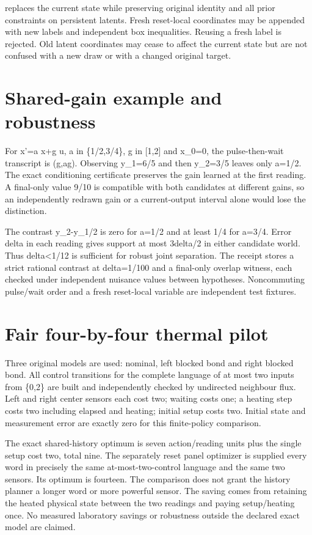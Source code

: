 \documentclass[
  11pt,
  a4paper,
]{report}
\let\singularitytexttt\texttt
\renewcommand{\texttt}[1]{\singularitytexttt{\seqsplit{#1}}}
\begin{document}
\texttt{affine\_reset} replaces the current state while preserving
original identity and all prior constraints on persistent latents. Fresh
reset-local coordinates may be appended with new labels and independent
box inequalities. Reusing a fresh label is rejected. Old latent
coordinates may cease to affect the current state but are not confused
with a new draw or with a changed original target.

\hypertarget{shared-gain-example-and-robustness}{%
\section{Shared-gain example and
robustness}\label{shared-gain-example-and-robustness}}

For x'=a x+g u, a in \{1/2,3/4\}, g in {[}1,2{]} and x\_0=0, the
pulse-then-wait transcript is (g,ag). Observing y\_1=6/5 and then
y\_2=3/5 leaves only a=1/2. The exact conditioning certificate preserves
the gain learned at the first reading. A final-only value 9/10 is
compatible with both candidates at different gains, so an independently
redrawn gain or a current-output interval alone would lose the
distinction.

The contrast y\_2-y\_1/2 is zero for a=1/2 and at least 1/4 for a=3/4.
Error delta in each reading gives support at most 3delta/2 in either
candidate world. Thus delta\textless1/12 is sufficient for robust joint
separation. The receipt stores a strict rational contrast at delta=1/100
and a final-only overlap witness, each checked under independent
nuisance values between hypotheses. Noncommuting pulse/wait order and a
fresh reset-local variable are independent test fixtures.

\hypertarget{fair-four-by-four-thermal-pilot}{%
\section{Fair four-by-four thermal
pilot}\label{fair-four-by-four-thermal-pilot}}

Three original models are used: nominal, left blocked bond and right
blocked bond. All control transitions for the complete language of at
most two inputs from \{0,2\} are built and independently checked by
undirected neighbour flux. Left and right center sensors each cost two;
waiting costs one; a heating step costs two including elapsed and
heating; initial setup costs two. Initial state and measurement error
are exactly zero for this finite-policy comparison.

The exact shared-history optimum is seven action/reading units plus the
single setup cost two, total nine. The separately reset panel optimizer
is supplied every word in precisely the same at-most-two-control
language and the same two sensors. Its optimum is fourteen. The
comparison does not grant the history planner a longer word or more
powerful sensor. The saving comes from retaining the heated physical
state between the two readings and paying setup/heating once. No
measured laboratory savings or robustness outside the declared exact
model are claimed.
\end{document}
